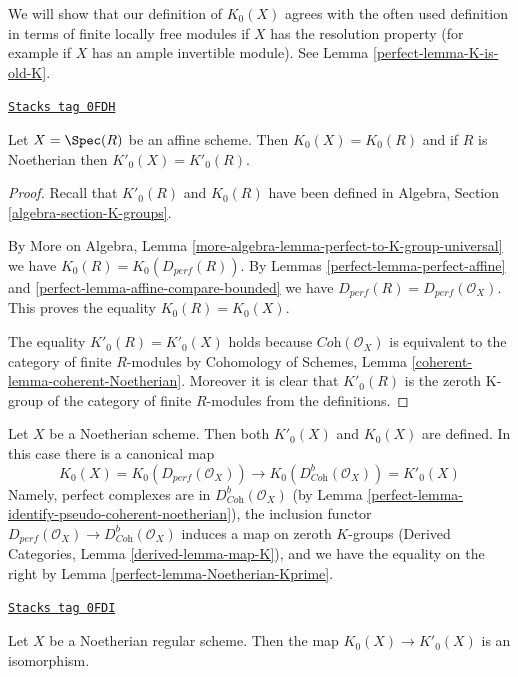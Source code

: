We will show that our definition of $K_0(X)$ agrees with the often used
definition in terms of finite locally free modules if $X$ has the
resolution property (for example if $X$ has an ample invertible module).
See Lemma \ref{perfect-lemma-K-is-old-K}.

\begin{lemma}
\label{perfect-lemma-K-agrees-affine}
\href{https://stacks.math.columbia.edu/tag/0FDH}{\texttt{Stacks tag 0FDH}}

Let $X = \Spec(R)$ be an affine scheme. Then $K_0(X) = K_0(R)$
and if $R$ is Noetherian then $K'_0(X) = K'_0(R)$.
\end{lemma}

\begin{proof}

Recall that $K'_0(R)$ and $K_0(R)$ have been defined in
Algebra, Section \ref{algebra-section-K-groups}.

\medskip\noindent
By More on Algebra, Lemma \ref{more-algebra-lemma-perfect-to-K-group-universal}
we have $K_0(R) = K_0(D_{perf}(R))$.
By Lemmas \ref{perfect-lemma-perfect-affine} and \ref{perfect-lemma-affine-compare-bounded}
we have $D_{perf}(R) = D_{perf}(\mathcal{O}_X)$.
This proves the equality $K_0(R) = K_0(X)$.

\medskip\noindent
The equality $K'_0(R) = K'_0(X)$ holds because
$\textit{Coh}(\mathcal{O}_X)$ is equivalent to the category
of finite $R$-modules by Cohomology of Schemes, Lemma
\ref{coherent-lemma-coherent-Noetherian}. Moreover it is
clear that $K'_0(R)$ is the zeroth K-group of the category
of finite $R$-modules from the definitions.
\end{proof}

Let $X$ be a Noetherian scheme. Then both $K'_0(X)$ and $K_0(X)$
are defined. In this case there is a canonical map
$$
K_0(X) = K_0(D_{perf}(\mathcal{O}_X))
\longrightarrow
K_0(D^b_{\textit{Coh}}(\mathcal{O}_X)) = K'_0(X)
$$
Namely, perfect complexes are in $D^b_{\textit{Coh}}(\mathcal{O}_X)$
(by Lemma \ref{perfect-lemma-identify-pseudo-coherent-noetherian}), the inclusion
functor
$D_{perf}(\mathcal{O}_X) \to D^b_{\textit{Coh}}(\mathcal{O}_X)$
induces a map on zeroth $K$-groups
(Derived Categories, Lemma \ref{derived-lemma-map-K}),
and we have the equality on the right by
Lemma \ref{perfect-lemma-Noetherian-Kprime}.

\begin{lemma}[Kprime K]
\label{perfect-lemma-Kprime-K}
\href{https://stacks.math.columbia.edu/tag/0FDI}{\texttt{Stacks tag 0FDI}}

Let $X$ be a Noetherian regular scheme. Then
the map $K_0(X) \to K'_0(X)$ is an isomorphism.
\end{lemma}

